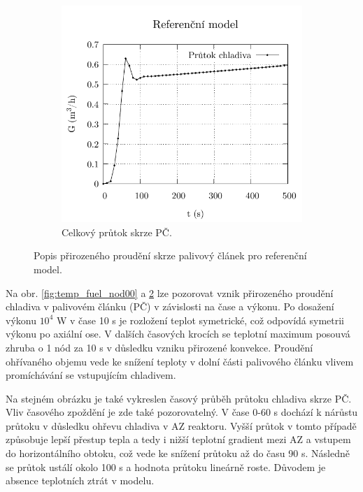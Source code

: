 \begin{figure}[H]
\begin{subfigure}{0.5\textwidth}
		\includegraphics[width=\textwidth, trim={0cm 0cm 0cm 0cm}, clip]{./05_TH_model_VR_1/grafy/nod_00_mass_flow_rate_fuel.pdf}
		\caption{Celkový průtok skrze PČ.}
		\label{fig:nod_00_mass_flow_rate}
	\end{subfigure}
	\caption{Popis přirozeného proudění skrze palivový článek pro referenční model.}
\end{figure}
Na obr. \ref{fig:temp_fuel_nod00} a \ref{fig:nod_00_mass_flow_rate} lze pozorovat vznik přirozeného proudění chladiva v palivovém článku (PČ) v závislosti na čase a výkonu. Po dosažení výkonu $10^4$ W v čase 10 s je rozložení teplot symetrické, což odpovídá symetrii výkonu po axiální ose. V dalších časových krocích se teplotní maximum posouvá zhruba o 1 nód za 10 s v důsledku vzniku přirozené konvekce. Proudění ohřívaného objemu vede ke snížení teploty v dolní části palivového článku vlivem promíchávání se vstupujícím chladivem.

Na stejném obrázku je také vykreslen časový průběh průtoku chladiva skrze PČ. Vliv časového zpoždění je zde také pozorovatelný. V čase 0-60 s dochází k nárůstu průtoku v důsledku ohřevu chladiva v AZ reaktoru. Vyšší průtok v tomto případě způsobuje lepší přestup tepla a tedy i nižší teplotní gradient mezi AZ a vstupem do horizontálního obtoku, což vede ke snížení průtoku až do času 90 s. Následně se průtok ustálí okolo 100 s a hodnota průtoku lineárně roste. Důvodem je absence teplotních ztrát v modelu.

